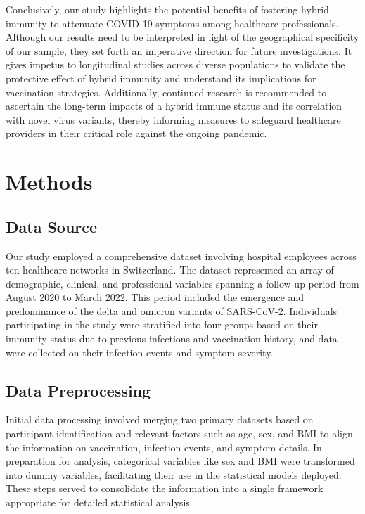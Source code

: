 \documentclass[11pt]{article}
\begin{document}
Conclusively, our study highlights the potential benefits of fostering hybrid immunity to attenuate COVID-19 symptoms among healthcare professionals. Although our results need to be interpreted in light of the geographical specificity of our sample, they set forth an imperative direction for future investigations. It gives impetus to longitudinal studies across diverse populations to validate the protective effect of hybrid immunity and understand its implications for vaccination strategies. Additionally, continued research is recommended to ascertain the long-term impacts of a hybrid immune status and its correlation with novel virus variants, thereby informing measures to safeguard healthcare providers in their critical role against the ongoing pandemic.

\section*{Methods}

\subsection*{Data Source}
Our study employed a comprehensive dataset involving hospital employees across ten healthcare networks in Switzerland. The dataset represented an array of demographic, clinical, and professional variables spanning a follow-up period from August 2020 to March 2022. This period included the emergence and predominance of the delta and omicron variants of SARS-CoV-2. Individuals participating in the study were stratified into four groups based on their immunity status due to previous infections and vaccination history, and data were collected on their infection events and symptom severity.

\subsection*{Data Preprocessing}
Initial data processing involved merging two primary datasets based on participant identification and relevant factors such as age, sex, and BMI to align the information on vaccination, infection events, and symptom details. In preparation for analysis, categorical variables like sex and BMI were transformed into dummy variables, facilitating their use in the statistical models deployed. These steps served to consolidate the information into a single framework appropriate for detailed statistical analysis.
\end{document}
